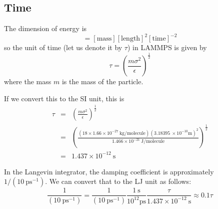 \documentclass[aps, 12pt, amsmath, amssymb, onecolumn, notitlepage, nofootinbib]{revtex4-1}
\begin{document}
\subsection{Time}

The dimension of energy is 
\begin{equation}
[\text{energy}] = [\text{mass}][\text{length}]^2[\text{time}]^{-2}
\end{equation}
so the unit of time (let us denote it by $\tau$) in LAMMPS is given by
\begin{equation}
\tau = \left(\frac{m \sigma^2}{\epsilon}\right)^\frac{1}{2} 
\label{tau}
\end{equation}
where the mass $m$ is the mass of the particle.

If we convert this to the SI unit, this is
\begin{eqnarray}
\tau &=&  \left(\frac{m \sigma^2}{\epsilon}\right)^\frac{1}{2} \nonumber\\
&=& \left(\frac{(18 \times 1.66 \times 10^{-27}\ \text{kg/molecule} ) (3.18395\ \times 10^{-10} \text{m})^2}{1.466 \times 10^{-21}\ \text{J/molecule} }\right)^\frac{1}{2} \nonumber\\
&=& 1.437 \times 10^{-12}\ \text{s} 
\end{eqnarray}

In the Langevin integrator, the damping coefficient is approximately $1/(10\ \text{ps}^{-1})$. We can convert that to the LJ unit as follows:
\begin{equation}
\frac{1}{(10\ \text{ps}^{-1})} = \frac{1}{(10\ \text{ps}^{-1})} \frac{1\ \text{s}}{10^{12} \text{ps}}  \frac{\tau}{ 1.437 \times 10^{-12}\ \text{s}} \approx 0.1 \tau 
\end{equation}
%






\end{document}
